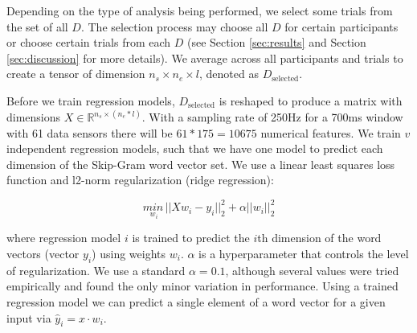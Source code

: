   Depending on the type of analysis being performed, we select some trials from the set of all $D$. The selection process may choose all $D$ for certain participants or choose certain trials from each $D$ (see Section \ref{sec:results} and Section \ref{sec:discussion} for more details). We average across all participants and trials to create a tensor of dimension $n_s \times n_e \times l$, denoted as $D_\text{selected}$.  
  
  

  Before we train regression models, $D_{\text{selected}}$ is reshaped to produce a matrix with dimensions $X \in \mathbb{R}^{n_s \times (n_e * l)}$.  With a sampling rate of 250Hz for a 700ms window with 61 data sensors there will be $61*175 = 10675$ numerical features. We train $v$ independent regression models, such that we have one model to predict each dimension of the Skip-Gram word vector set. We use a linear least squares loss function and l2-norm regularization (ridge regression):

  \begin{equation}
    \underset{w_i}{min\,} {|| X w_i - y_i||_2^2 + \alpha ||w_i||_2^2}
    \label{eq:ridge}
  \end{equation}
  
  \noindent where regression model $i$ is trained to predict the $i$th dimension of the word vectors (vector $y_i$) using weights $w_i$. $\alpha$ is a hyperparameter that controls the level of regularization. We use a standard $\alpha = 0.1$, although several values were tried empirically and found the only minor variation in performance. Using a trained regression model we can predict a single element of a word vector for a given input via $\hat{y}_i = x \cdot w_i$.
  
